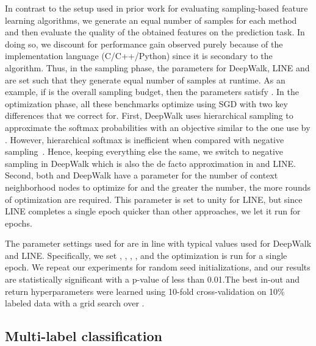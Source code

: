 In contrast to the setup used in prior work for evaluating sampling-based feature learning algorithms, we generate an equal number of samples for each method and then evaluate the quality of the obtained features on the prediction task. In doing so, we discount for performance gain observed purely because of the implementation language (C/C++/Python) since it is secondary to the algorithm.
Thus, in the sampling phase, the parameters for DeepWalk, LINE and \nodevec are set such that they generate equal number of samples at runtime. As an example, if  is the overall sampling budget, then the \nodevec parameters satisfy . In the optimization phase, all these benchmarks optimize using SGD with two key differences that we correct for. First, DeepWalk uses hierarchical sampling to approximate the softmax probabilities with an objective similar to the one use by \nodevec. However, hierarchical softmax is inefficient when compared with negative sampling~\cite{word2vec2}. Hence, keeping everything else the same, we switch to negative sampling in DeepWalk which is also the de facto approximation in \nodevec and LINE. Second, both \nodevec and DeepWalk have a parameter for the number of context neighborhood nodes to optimize for and the greater the number, the more rounds of optimization are required. This parameter is set to unity for LINE, but since LINE completes a single epoch quicker than other approaches, we let it run for  epochs.

The parameter settings used for \nodevec are in line with typical values used for DeepWalk and LINE. Specifically, we set , , , , and the optimization is run for a single epoch. We repeat our experiments for  random seed initializations, and our results are statistically significant with a p-value of less than 0.01.The best in-out and return hyperparameters were learned using 10-fold cross-validation on 10\% labeled data with a grid search over . 


\subsection{Multi-label classification}







